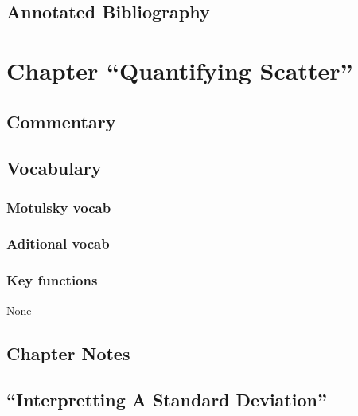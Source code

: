 \documentclass[]{book}
\theoremstyle{definition}
\theoremstyle{definition}
\theoremstyle{definition}
\theoremstyle{remark}
\begin{document}
\section*{Annotated Bibliography}\label{annotated-bibliography-3}

\chapter{\texorpdfstring{Chapter ``Quantifying
Scatter''}{Chapter Quantifying Scatter}}\label{chapter-quantifying-scatter}

\section*{Commentary}\label{commentary-7}

\section*{Vocabulary}\label{vocabulary-8}

\subsection{Motulsky vocab}\label{motulsky-vocab-8}

\subsection{Aditional vocab}\label{aditional-vocab-5}

\subsection{Key functions}\label{key-functions-7}

None

\section*{Chapter Notes}\label{chapter-notes-8}

\section{\texorpdfstring{``Interpretting A Standard
Deviation''}{Interpretting A Standard Deviation}}\label{interpretting-a-standard-deviation}
\end{document}
